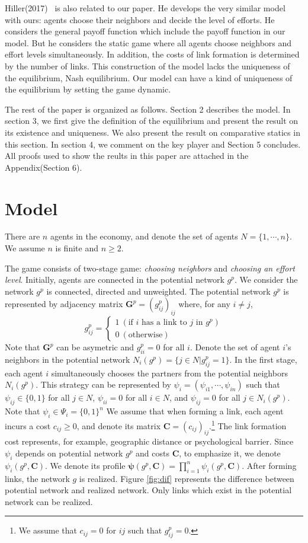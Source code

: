 \documentclass[12pt]{article}
\theoremstyle{definition}
\begin{document}
Hiller(2017)~\cite{hiller} is also related to our paper.
He develops the very similar model with ours: agents choose their neighbors and decide the level of efforts.
He considers the general payoff function which include the payoff function in our model.
But he considers the static game where all agents choose neighbors and effort levels simultaneously.
In addition, the costs of link formation is determined by the number of links.
This construction of the model lacks the uniqueness of the equilibrium, Nash equilibrium.
Our model can have a kind of uniqueness of the equilibrium by setting the game dynamic.

The rest of the paper is organized as follows.
Section 2 describes the model.
In section 3, we first give the definition of the equilibrium and present the result on its existence and uniqueness.
We also present the result on comparative statics in this section.
In section 4, we comment on the key player and Section 5 concludes.
All proofs used to show the reults in this paper are attached in the Appendix(Section 6).


\section{Model}

There are $n$ agents in the economy, and denote the set of agents $N = \{ 1, \cdots, n\}$.
We assume $n$ is finite and $n \ge 2$.

The game consists of two-stage game: {\it{choosing neighbors}} and {\it{choosing an effort level}}.
Initially, agents are connected in the potential network $g^p$.
We consider the network $g^p$ is connected, directed and unweighted.
The potential network $g^p$ is represented by adjacency matrix $\bm{G}^p = {(g_{ij}^p)}_{ij}$ where, for any $i \neq j$,
\[ g_{ij}^p =
	\begin{cases}
		1 \  (\text{if $i$ has a link to $j$ in $g^p $}) \\
		0 \  (\text{otherwise})
	\end{cases} \]
Note that $\bm{G}^p$ can be asymetric and $g_{ii}^p = 0$ for all $i$.
Denote the set of agent $i$'s neighbors in the potential network $N_i(g^p) = \{ j \in N | g_{ij}^p = 1 \}$.
In the first stage, each agent $i$ simultaneously chooses the partners from the potential neighbors $N_i(g^p)$.
This strategy can be represented by $\psi_i = (\psi_{i1}, \cdots, \psi_{in})$ such that $\psi_{ij} \in \{0, 1\}$ for all $j \in N$, $\psi_{ii}=0$ for all $i \in N$, and $\psi_{ij} = 0$ for all $j \in N_i(g^p)$.
Note that $\psi_i \in \Psi_i = \{0, 1\}^{n}$
We assume that when forming a link, each agent incurs a cost $c_{ij} \ge 0$, and denote its matrix $\bm{C} = {(c_{ij})}_{ij}$.\footnote{We assume that $c_{ij} = 0$ for $ij$ such that $g_{ij}^p = 0$.}
The link formation cost represents, for example, geographic distance or psychological barrier.
Since $\psi_i$ depends on potential network $g^p$ and costs $\bm{C}$, to emphasize it, we denote $\psi_i(g^p, \bm{C})$.
We denote its profile $\bm{\psi}(g^p, \bm{C}) = \prod_{i=1}^n \psi_i(g^p, \bm{C})$.
After forming links, the network $g$ is realized.
Figure \ref{fig:dif} represents the difference between potential network and realized network.
Only links which exist in the potential network can be realized.
\end{document}
